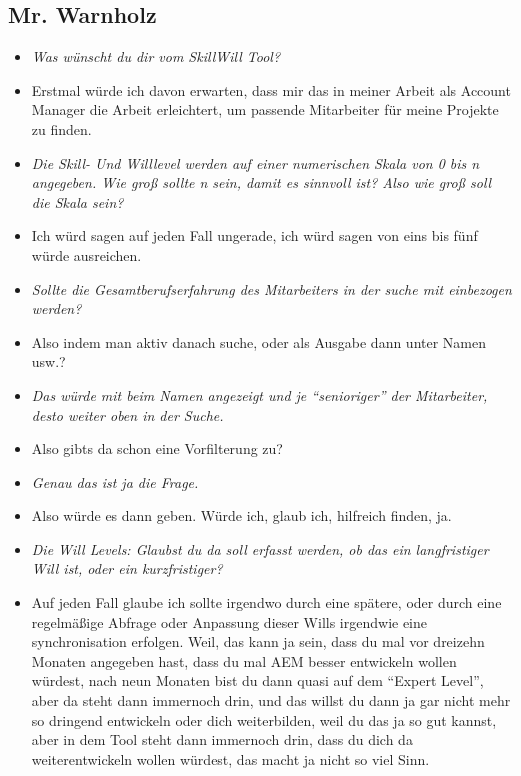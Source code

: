 \subsection{Mr. Warnholz}
\begin{itemize}
\item[] \textit{Was wünscht du dir vom SkillWill Tool?}
\item[] Erstmal würde ich davon erwarten, dass mir das in meiner Arbeit als Account Manager die Arbeit erleichtert, um passende Mitarbeiter für meine Projekte zu finden.

\item[] \textit{Die Skill- Und Willlevel werden auf einer numerischen Skala von 0 bis n angegeben. Wie groß sollte n sein, damit es sinnvoll ist? Also wie groß soll die Skala sein?}
\item[] Ich würd sagen auf jeden Fall ungerade, ich würd sagen von eins bis fünf würde ausreichen.

\item[] \textit{Sollte die Gesamtberufserfahrung des Mitarbeiters in der suche mit einbezogen werden?}
\item[] Also indem man aktiv danach suche, oder als Ausgabe dann unter Namen usw.?

\item[] \textit{Das würde mit beim Namen angezeigt und je “senioriger” der Mitarbeiter, desto weiter oben in der Suche.}
\item[] Also gibts da schon eine Vorfilterung zu?

\item[] \textit{Genau das ist ja die Frage.}
\item[] Also würde es dann geben. Würde ich, glaub ich, hilfreich finden, ja.

\item[] \textit{Die Will Levels: Glaubst du da soll erfasst werden, ob das ein langfristiger Will ist, oder ein kurzfristiger?}
\item[] Auf jeden Fall glaube ich sollte irgendwo durch eine spätere, oder durch eine regelmäßige Abfrage oder Anpassung dieser Wills irgendwie eine synchronisation erfolgen. Weil, das kann ja sein, dass du mal vor dreizehn Monaten angegeben hast, dass du mal AEM besser entwickeln wollen würdest, nach neun Monaten bist du dann quasi auf dem “Expert Level”, aber da steht dann immernoch drin, und das willst du dann ja gar nicht mehr so dringend entwickeln oder dich weiterbilden, weil du das ja so gut kannst, aber in dem Tool steht dann immernoch drin, dass du dich da weiterentwickeln wollen würdest, das macht ja nicht so viel Sinn.


\end{itemize}
